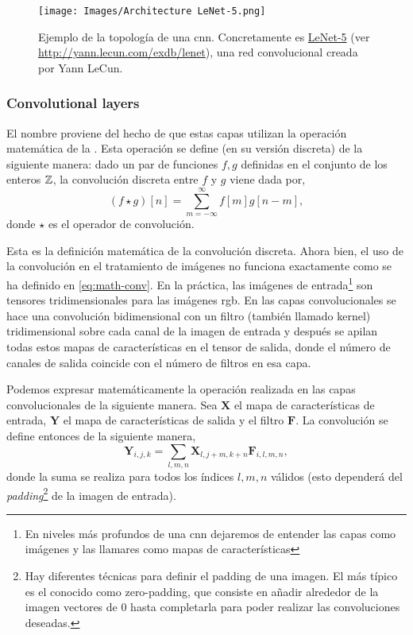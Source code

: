 \begin{figure}[ht]
  \centering
  \texttt{[image: Images/Architecture LeNet-5.png]}
  \caption[Ejemplo de topología de una \acs*{cnn} (LeNet-5)]{Ejemplo de la
    topología de una \gls{cnn}. Concretamente es
    \href{http://yann.lecun.com/exdb/lenet}{LeNet-5} (ver
    \url{http://yann.lecun.com/exdb/lenet}), una red convolucional creada por
    Yann LeCun.}
  \label{fig:lenet-5}
\end{figure}

\subsubsection{Convolutional layers}
El nombre proviene del hecho de que estas capas utilizan la operación
matemática de la
. Esta operación
se define (en su versión discreta) de la siguiente manera: dado un par de
funciones \(f, g\) definidas en el conjunto de los enteros \(\mathbb{Z}\), la
convolución discreta entre \(f\) y \(g\) viene dada por,
\begin{equation} \label{eq:math-conv}
  (f \star g)[n] = \sum_{m=-\infty}^{\infty} f[m]g[n - m],
\end{equation}
donde \(\star\) es el operador de convolución.

Esta es la definición matemática de la convolución discreta. Ahora bien, el uso
de la convolución en el tratamiento de imágenes no funciona exactamente como se
ha definido en \vref{eq:math-conv}. En la práctica, las imágenes de
entrada\footnote{En niveles más profundos de una \gls{cnn} dejaremos de
  entender las capas como imágenes y las llamares como mapas de
  características} son tensores tridimensionales para las imágenes
\acs{rgb}. En las capas convolucionales se hace una convolución
bidimensional con un filtro (también llamado kernel) tridimensional sobre cada
canal de la imagen de entrada y después se apilan todas estos mapas de
características en el tensor de salida, donde el número de canales de salida
coincide con el número de filtros en esa capa.

Podemos expresar matemáticamente la operación realizada en las capas
convolucionales de la siguiente manera. Sea \(\mathbf{X}\) el
mapa de características de entrada, \(\mathbf{Y}\) el mapa de características
de salida y el filtro \(\mathbf{F}\). La convolución se define entonces de la
siguiente manera,
\begin{equation} \label{eq:convolution}
  \mathbf{Y}_{i, j, k} =
  \sum_{l, m, n} \mathbf{X}_{l, j + m, k + n}\mathbf{F}_{i, l, m, n},
\end{equation}
donde la suma se realiza para todos los índices \(l, m, n\) válidos (esto
dependerá del \emph{padding}\footnote{Hay diferentes técnicas para definir el
  padding de una imagen. El más típico es el conocido como zero-padding, que
  consiste en añadir alrededor de la imagen vectores de 0 hasta completarla
  para poder realizar las convoluciones deseadas.} de la imagen de entrada).

